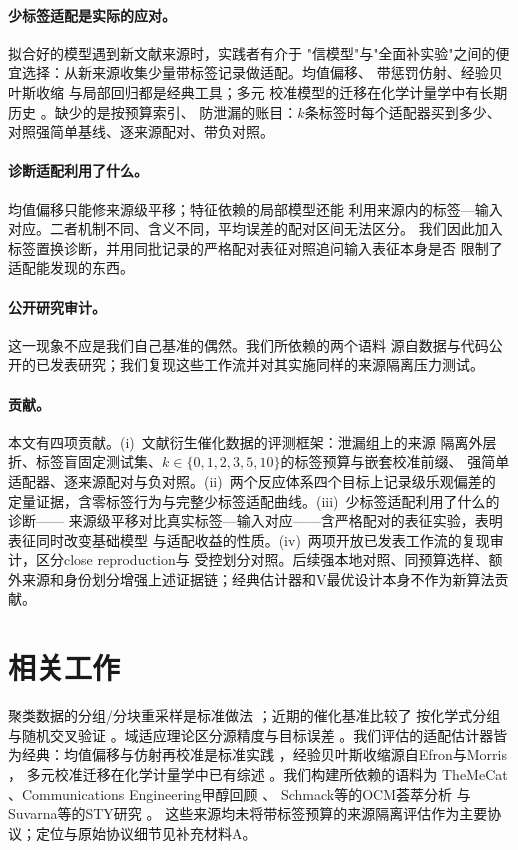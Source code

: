 \documentclass[11pt,a4paper]{article}
\begin{document}
\paragraph{少标签适配是实际的应对。}拟合好的模型遇到新文献来源时，实践者有介于
"信模型"与"全面补实验"之间的便宜选择：从新来源收集少量带标签记录做适配。均值偏移、
带惩罚仿射、经验贝叶斯收缩 \cite{efron} 与局部回归都是经典工具；多元
校准模型的迁移在化学计量学中有长期历史 \cite{feudale}。缺少的是按预算索引、
防泄漏的账目：$k$条标签时每个适配器买到多少、对照强简单基线、逐来源配对、带负对照。

\paragraph{诊断适配利用了什么。}均值偏移只能修来源级平移；特征依赖的局部模型还能
利用来源内的标签—输入对应。二者机制不同、含义不同，平均误差的配对区间无法区分。
我们因此加入标签置换诊断，并用同批记录的严格配对表征对照追问输入表征本身是否
限制了适配能发现的东西。

\paragraph{公开研究审计。}这一现象不应是我们自己基准的偶然。我们所依赖的两个语料
源自数据与代码公开的已发表研究；我们复现这些工作流并对其实施同样的来源隔离压力测试。

\paragraph{贡献。}本文有四项贡献。(i)~文献衍生催化数据的评测框架：泄漏组上的来源
隔离外层折、标签盲固定测试集、$k\in\{0,1,2,3,5,10\}$的标签预算与嵌套校准前缀、
强简单适配器、逐来源配对与负对照。(ii)~两个反应体系四个目标上记录级乐观偏差的
定量证据，含零标签行为与完整少标签适配曲线。(iii)~少标签适配利用了什么的诊断——
来源级平移对比真实标签—输入对应——含严格配对的表征实验，表明表征同时改变基础模型
与适配收益的性质。(iv)~两项开放已发表工作流的复现审计，区分close reproduction与
受控划分对照。后续强本地对照、同预算选样、额外来源和身份划分增强上述证据链；经典估计器和V最优设计本身不作为新算法贡献。

\section{相关工作}
聚类数据的分组/分块重采样是标准做法 \cite{roberts}；近期的催化基准比较了
按化学式分组与随机交叉验证 \cite{wu}。域适应理论区分源精度与目标误差
\cite{bendavid}。我们评估的适配估计器皆为经典：均值偏移与仿射再校准是标准实践
\cite{steyerberg2019}，经验贝叶斯收缩源自Efron与Morris \cite{efron}，
多元校准迁移在化学计量学中已有综述 \cite{feudale}。我们构建所依赖的语料为
TheMeCat \cite{toldy}、Communications Engineering甲醇回顾 \cite{yan}、
Schmack等的OCM荟萃分析 \cite{schmack} 与Suvarna等的STY研究 \cite{suvarna}。
这些来源均未将带标签预算的来源隔离评估作为主要协议；定位与原始协议细节见补充材料A。
\end{document}
